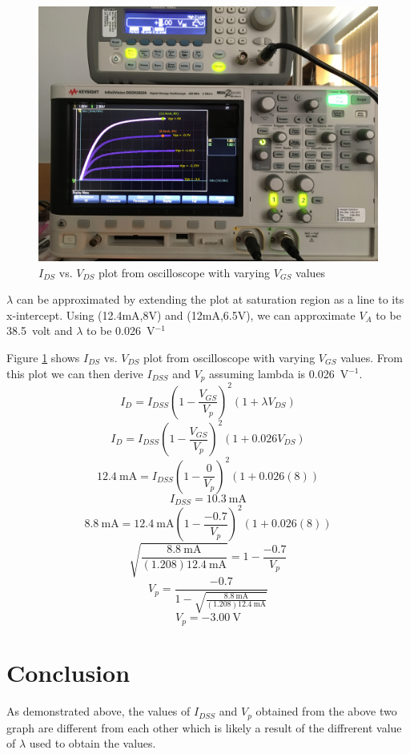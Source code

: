 \documentclass{article}
\begin{document}
\begin{figure}[H]
  \centering
  \includegraphics[width=\textwidth]{ECE2200L_Lab10_IVds.JPG}
  \caption{$I_{DS}$ vs. $V_{DS}$ plot from oscilloscope with varying $V_{GS}$ values}
  \label{fig:ivds}
\end{figure}
$\lambda$ can be approximated by extending the plot at saturation region as a line to its x-intercept.
Using (12.4mA,8V) and (12mA,6.5V), we can approximate $V_A$ to be \SI{38.5}{volt} and $\lambda$ to be \SI{0.026}{\volt}$^{-1}$

Figure \ref{fig:ivds} shows $I_{DS}$ vs. $V_{DS}$ plot from oscilloscope with varying $V_{GS}$ values.
From this plot we can then derive $I_{DSS}$ and $V_p$ assuming lambda is \SI{0.026}{\volt}$^{-1}$.
$$I_D = I_{DSS} \left(1-\frac{V_{GS}}{V_p}\right)^2(1+\lambda V_{DS})$$
$$I_D = I_{DSS} \left(1-\frac{V_{GS}}{V_p}\right)^2(1+0.026 V_{DS})$$
$$\SI{12.4}{\milli\ampere} = I_{DSS} \left(1-\frac{0}{V_p}\right)^2(1+0.026 (8))$$
$$I_{DSS} = \SI{10.3}{\milli\ampere}$$
$$\SI{8.8}{\milli\ampere} =  \SI{12.4}{\milli\ampere}\left(1-\frac{-0.7}{V_p}\right)^2(1+0.026 (8))$$
$$\sqrt{\frac{\SI{8.8}{\milli\ampere}}{(1.208)\SI{12.4}{\milli\ampere}}}=1-\frac{-0.7}{V_p}$$
$$V_p= \frac{-0.7}{1-\sqrt{\frac{\SI{8.8}{\milli\ampere}}{(1.208)\SI{12.4}{\milli\ampere}}}}$$
$$V_p = -\SI{3.00}{\volt}$$

\section*{Conclusion}
As demonstrated above, the values of $I_{DSS}$ and $V_p$ obtained from the above two graph are different from each other which is likely a result of the diffrerent value of $\lambda$ used to obtain the values.
\end{document}

